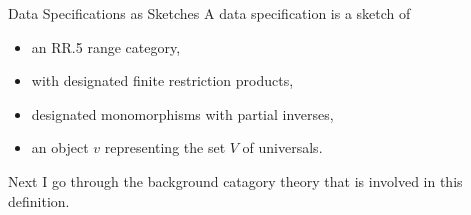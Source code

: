 \begin{frame}{Data Specifications as Sketches}
A data specification is a sketch of 
\begin{itemize}
\item  an RR.5 range category, 
\item with  designated finite restriction products,
\item designated monomorphisms with partial inverses,
\item an object $v$ representing the set $V$ of universals.
\end{itemize}

Next I go through the background catagory theory that is involved in this definition. 
\end{frame}

